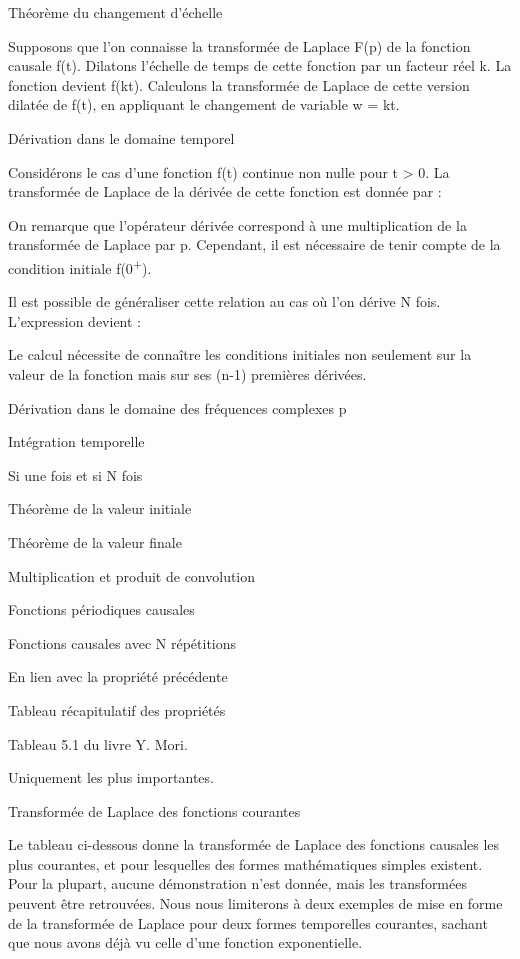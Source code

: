 \documentclass[]{article}
\begin{document}
Théorème du changement d'échelle

Supposons que l'on connaisse la transformée de Laplace F(p) de la
fonction causale f(t). Dilatons l'échelle de temps de cette fonction par
un facteur réel k. La fonction devient f(kt). Calculons la transformée
de Laplace de cette version dilatée de f(t), en appliquant le changement
de variable w = kt.

Dérivation dans le domaine temporel

Considérons le cas d'une fonction f(t) continue non nulle pour t
\textgreater{} 0. La transformée de Laplace de la dérivée de cette
fonction est donnée par :

On remarque que l'opérateur dérivée correspond à une multiplication de
la transformée de Laplace par p. Cependant, il est nécessaire de tenir
compte de la condition initiale f(0\textsuperscript{+}).

Il est possible de généraliser cette relation au cas où l'on dérive N
fois. L'expression devient :

Le calcul nécessite de connaître les conditions initiales non seulement
sur la valeur de la fonction mais sur ses (n-1) premières dérivées.

Dérivation dans le domaine des fréquences complexes p

Intégration temporelle

Si une fois et si N fois

Théorème de la valeur initiale

Théorème de la valeur finale

Multiplication et produit de convolution

Fonctions périodiques causales

Fonctions causales avec N répétitions

En lien avec la propriété précédente

Tableau récapitulatif des propriétés

Tableau 5.1 du livre Y. Mori.

Uniquement les plus importantes.

Transformée de Laplace des fonctions courantes

Le tableau ci-dessous donne la transformée de Laplace des fonctions
causales les plus courantes, et pour lesquelles des formes mathématiques
simples existent. Pour la plupart, aucune démonstration n'est donnée,
mais les transformées peuvent être retrouvées. Nous nous limiterons à
deux exemples de mise en forme de la transformée de Laplace pour deux
formes temporelles courantes, sachant que nous avons déjà vu celle d'une
fonction exponentielle.
\end{document}
